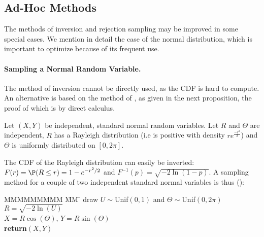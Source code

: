 \subsection{Ad-Hoc Methods}
The methods of inversion and rejection sampling may be improved in
some special cases. We mention in detail the case of the normal
distribution, which is important to optimize because of its
frequent use.

\paragraph{Sampling a Normal Random Variable. }The method of inversion
cannot be directly used, as the CDF is hard to compute. An
alternative is based on the method of , as given in the next proposition, the proof
of which is by direct calculus.
\begin{proposition}
Let $(X,Y)$ be independent, standard normal random variables. Let
 \ben
{}\een
$R$ and $\Theta$ are independent, $R$ has a Rayleigh distribution
(i.e is positive with density
 $
 r e^{\frac{-r^2}{2}}
 $)
 and $\Theta$ is
uniformly distributed on $[0, 2\pi]$.
\end{proposition}
The CDF of the Rayleigh distribution can easily be inverted:
$F(r)=\P(R \leq r)= 1-e^{-r^2/2}$ and $F^{-1}(p)=\sqrt{-2
\ln(1-p)}$. A sampling method for a couple of two independent
standard normal variables is thus ():
\begin{tabbing}
  MMMMMMMMM \= MM \=  \kill
   \> draw $U\sim$Unif$(0,1)$ and $\Theta\sim$Unif$(0,2\pi)$\\
  \> $R=\sqrt{-2 \ln(U)}$ \\
  \>$X= R\cos(\Theta)$, $Y= R \sin(\Theta)$\\
  \>\textbf{return}$(X,Y)$
\end{tabbing}


